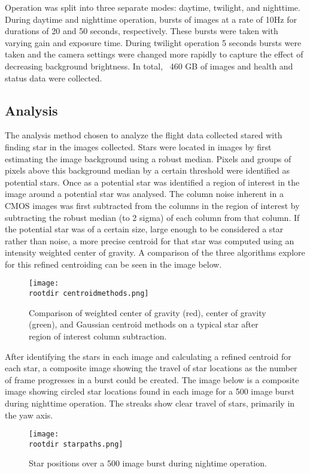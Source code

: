 \documentclass[twocolumn,letterpaper]{IEEEAerospace2012}
\newcommand{\rootdir}{./Figures/}
\begin{document}
Operation was split into three separate modes: daytime, twilight, and nighttime. During daytime and nighttime operation, bursts of images at a rate of 10Hz for durations of 20 and 50 seconds, respectively. These bursts were taken with varying gain and exposure time. During twilight operation 5 seconds bursts were taken and the camera settings were changed more rapidly to capture the effect of decreasing background brightness. In total, ~460 GB of images and health and status data were collected.

\subsection{Analysis}
The analysis method chosen to analyze the flight data collected stared with finding star in the images collected. Stars were located in images by first estimating the image background using a robust median. Pixels and groups of pixels above this background median by a certain threshold were identified as potential stars. Once as a potential star was identified a region of interest in the image around a potential star was analysed. The column noise inherent in a CMOS images was first subtracted from the columns in the region of interest by subtracting the robust median (to 2 sigma) of each column from that column. If the potential star was of a certain size, large enough to be considered a star rather than noise, a more precise centroid for that star was computed using an intensity weighted center of gravity. A comparison of the three algorithms explore for this refined centroiding can be seen in the image below. 
\begin{figure}
    \centering
    \texttt{[image: \\rootdir centroidmethods.png]}
    \caption{Comparison of weighted center of gravity (red), center of gravity (green), and Gaussian centroid methods on a typical star after region of interest column subtraction.}
    \label{fig:centroidmethods}
\end{figure}

After identifying the stars in each image and calculating a refined centroid for each star, a composite image showing the travel of star locations as the number of frame progresses in a burst could be created. The image below is a composite image showing circled star locations found in each image for a 500 image burst during nighttime operation. The streaks show clear travel of stars, primarily in the yaw axis.
\begin{figure}
    \centering
    \texttt{[image: \\rootdir starpaths.png]}
    \caption{Star positions over a 500 image burst during nightime operation.}
    \label{fig:starpaths}
\end{figure}
\end{document}
